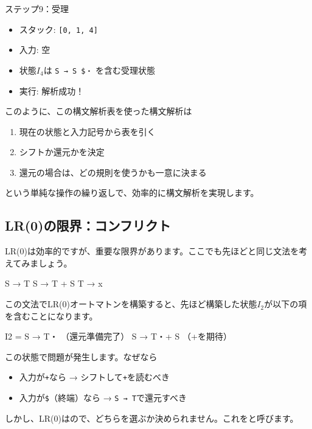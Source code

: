 ステップ9：受理

\begin{itemize}
\item
  スタック: \texttt{{[}0,\ 1,\ 4{]}}
\item
  入力: 空
\item
  状態\(I_4\)は \texttt{S\textquotesingle{}\ →\ S\ \$・} を含む受理状態
\item
  実行: 解析成功！
\end{itemize}

このように、この構文解析表を使った構文解析は

\begin{enumerate}
\item
  現在の状態と入力記号から表を引く
\item
  シフトか還元かを決定
\item
  還元の場合は、どの規則を使うかも一意に決まる
\end{enumerate}

\noindent という単純な操作の繰り返しで、効率的に構文解析を実現します。

\subsection{LR(0)の限界：コンフリクト}

LR(0)は効率的ですが、重要な限界があります。ここでも先ほどと同じ文法を考えてみましょう。

\begin{codescreen}{}
S → T
S → T + S
T → x
\end{codescreen}

この文法でLR(0)オートマトンを構築すると、先ほど構築した状態\(I_2\)が以下の項を含むことになります。

\begin{codescreen}{}
I2 = {
    S → T・       （還元準備完了）
    S → T・+ S    （+を期待）
}
\end{codescreen}

この状態で問題が発生します。なぜなら

\begin{itemize}
\item
  入力が\texttt{+}なら → シフトして\texttt{+}を読むべき
\item
  入力が\texttt{\$}（終端）なら → \texttt{S\ →\ T}で還元すべき
\end{itemize}

しかし、LR(0)はので、どちらを選ぶか決められません。これをと呼びます。

